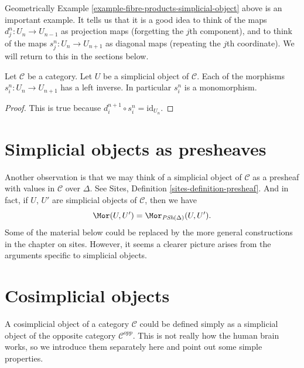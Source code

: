 \noindent
Geometrically Example \ref{example-fibre-products-simplicial-object}
above is an important example. It tells us that it is a good
idea to think of the maps $d^n_j : U_n \to U_{n - 1}$
as projection maps (forgetting the $j$th component),
and to think of the maps $s^n_j : U_n \to U_{n + 1}$
as diagonal maps (repeating the $j$th coordinate).
We will return to this in the sections below.

\begin{lemma}
\label{lemma-si-injective}
Let $\mathcal{C}$ be a category.
Let $U$ be a simplicial object of $\mathcal{C}$.
Each of the morphisms $s^n_i : U_n \to U_{n + 1}$
has a left inverse. In particular $s^n_i$ is a monomorphism.
\end{lemma}

\begin{proof}
This is true because $d_i^{n + 1} \circ s^n_i = \text{id}_{U_n}$.
\end{proof}

\section{Simplicial objects as presheaves}
\label{section-simplicial-presheaves}

\noindent
Another observation is that we may think of a simplicial
object of $\mathcal{C}$ as a presheaf with values in $\mathcal{C}$
over $\Delta$. See
Sites, Definition \ref{sites-definition-presheaf}.
And in fact, if $U$, $U'$ are simplicial objects
of $\mathcal{C}$, then we have
\begin{equation}
\label{equation-simplicial-set-presheaf}
\Mor(U, U') = \Mor_{\textit{PSh}(\Delta)}(U, U').
\end{equation}
Some of the material below could be replaced by the more
general constructions in the chapter on sites.
However, it seems a clearer picture arises from the
arguments specific to simplicial objects.
















\section{Cosimplicial objects}
\label{section-cosimplicial-object}

\noindent
A cosimplicial object of a category $\mathcal{C}$ could
be defined simply as a simplicial object of the
opposite category $\mathcal{C}^{opp}$. This is not
really how the human brain works, so we introduce
them separately here and point out some simple
properties.

